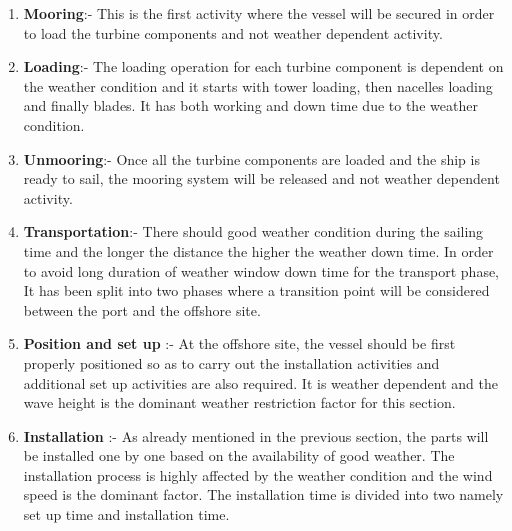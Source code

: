 \begin{enumerate}
\item \textbf{Mooring}:- This is the first activity where the vessel will be secured in order to load the turbine components and not weather dependent activity.
\item \textbf{Loading}:- The loading operation for each turbine component is dependent on the weather condition and it starts with tower loading, then nacelles loading and finally blades. It has both working and down time due to the weather condition.
\item \textbf{Unmooring}:- Once all the turbine components are loaded and the ship is ready to sail, the mooring system will be released and not weather dependent activity.
\item \textbf{Transportation}:- There should good weather condition during the sailing time and the longer the distance the higher the weather down time. In order to avoid long duration of weather window down time  for the transport phase, It has been split into two phases where a transition point will be considered between the port and the offshore site.
\item \textbf{Position and set up} :- At the offshore site, the vessel should be first properly positioned so as to carry out the installation activities and  additional set up activities are also required. It is weather dependent and the wave height is the dominant weather restriction factor for this section.

\item \textbf{Installation} :- As already mentioned in the previous section, the parts will be installed one by one based on the availability of good weather. The installation process is highly affected by the weather condition and the wind speed is the dominant factor. The installation time is  divided into two namely set up time and installation time. 
\end{enumerate}
